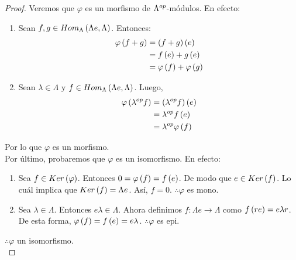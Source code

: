 \documentclass{article}
\begin{document}
\begin{enumerate}[label=\textbf{Ej \arabic*.}]
\begin{proof}
			Veremos que $\varphi$ es un morfismo de ${\Lambda}^{op}$-módulos. En efecto:
			\begin{enumerate}
				\item Sean $f,g\in Hom_{\Lambda}\left(\Lambda e,\Lambda\right)$. Entonces:
				\begin{align*}
					\varphi\left(f+g\right)&=\left(f+g\right)\left(e\right)\\
					&=f\left(e\right)+g\left(e\right)\\
					&=\varphi\left(f\right)+\varphi\left(g\right)
				\end{align*}
				\item Sean $\lambda\in\Lambda$ y $f\in Hom_{\Lambda}\left(\Lambda e,\Lambda\right)$. Luego,
				\begin{align*}
					\varphi\left({\lambda}^{op}f\right)&=\left({\lambda}^{op}f\right)\left(e\right)\\
					&={\lambda}^{op}f\left(e\right)\\
					&={\lambda}^{op}\varphi\left(f\right)
				\end{align*}
			\end{enumerate}
			Por lo que $\varphi$ es un morfismo.\\
		
			Por último, probaremos que $\varphi$ es un isomorfismo. En efecto:
			\begin{enumerate}
				\item Sea $f \in Ker\left(\varphi\right)$. Entonces $0=\varphi\left(f\right)=f\left(e\right)$. De modo que $e \in Ker\left(f\right)$. Lo cuál implica que $Ker\left(f\right)=\Lambda e$. Así, $f=0$. $\therefore\varphi$ es mono.
				\item Sea $\lambda \in \Lambda$. Entonces $e\lambda\in\Lambda$. Ahora definimos $f:\Lambda e \longrightarrow\Lambda$ como $f\left(re\right)=e\lambda r$. De esta forma, $\varphi\left(f\right)=f\left(e\right)=e\lambda$. $\therefore\varphi$ es epi.
			\end{enumerate}
			$\therefore\varphi$ un isomorfismo.\\
		

\end{proof}
\end{enumerate}
\end{document}
